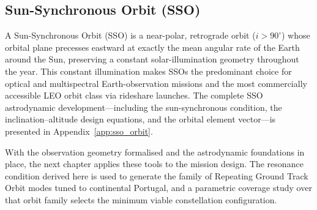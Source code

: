 \subsection{Sun-Synchronous Orbit (SSO)}

A Sun-Synchronous Orbit (SSO) is a near-polar, retrograde orbit ($i > 90^{\circ}$) whose orbital plane precesses eastward at exactly the mean angular rate of the Earth around the Sun, preserving a constant solar-illumination geometry throughout the year.  This constant illumination makes SSOs the predominant choice for optical and multispectral Earth-observation missions and the most commercially accessible LEO orbit class via rideshare launches.  The complete SSO astrodynamic development---including the sun-synchronous condition, the inclination--altitude design equations, and the orbital element vector---is presented in Appendix~\ref{app:sso_orbit}.

With the observation geometry formalised and the astrodynamic foundations in place, the next chapter applies these tools to the mission design. The resonance condition derived here is used to generate the family of Repeating Ground Track Orbit modes tuned to continental Portugal, and a parametric coverage study over that orbit family selects the minimum viable constellation configuration.


